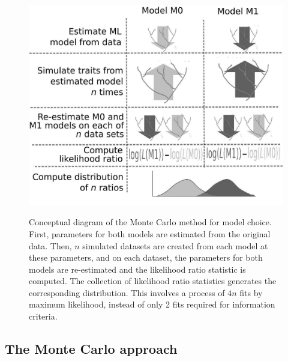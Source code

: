 \begin{figure}[t]
\begin{center}
\includegraphics[width=12cm]{../pmc/boettiger_figure2_bw.pdf}\label{fig:concept} 

\end{center}
\caption{
Conceptual diagram of the Monte Carlo method for model choice.  
First, parameters for both models are estimated from the original data. 
Then, $n$ simulated datasets are created from each model at these parameters, 
and on each dataset,
the parameters for both models are re-estimated
and the likelihood ratio statistic is computed.
The collection of likelihood ratio statistics generates the corresponding distribution.  
This involves a process of $4n$ fits by maximum likelihood, instead of only 2 fits required for information criteria.
}
\end{figure}


\subsection{The Monte Carlo approach}

